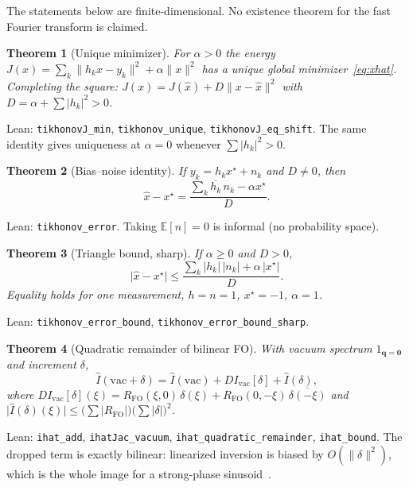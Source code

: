 \documentclass[11pt,a4paper]{article}
\newtheorem{theorem}{Theorem}[section]
\theoremstyle{definition}
\theoremstyle{remark}
\newcommand{\abs}[1]{\lvert#1\rvert}
\newcommand{\norm}[1]{\lVert#1\rVert}
\newcommand{\RFO}{R_{\mathrm{FO}}}
\begin{document}
The statements below are finite-dimensional.
No existence theorem for the fast Fourier transform is claimed.

\begin{theorem}[Unique minimizer]
\label{thm:unique}
For $\alpha>0$ the energy
$J(x)=\sum_k\norm{h_k x-y_k}^2+\alpha\norm{x}^2$
has a unique global minimizer~\eqref{eq:xhat}.
Completing the square:
$J(x)=J(\hat x)+D\norm{x-\hat x}^2$ with $D=\alpha+\sum\abs{h_k}^2>0$.
\end{theorem}
Lean: \texttt{tikhonovJ\_min}, \texttt{tikhonov\_unique},
\texttt{tikhonovJ\_eq\_shift}.
The same identity gives uniqueness at $\alpha=0$ whenever
$\sum\abs{h_k}^2>0$.

\begin{theorem}[Bias--noise identity]
\label{thm:error}
If $y_k=h_k x^\star+n_k$ and $D\neq 0$, then
\begin{equation}
\hat x-x^\star
=
\frac{\sum_k\overline{h_k}\,n_k-\alpha x^\star}{D}.
\end{equation}
\end{theorem}
Lean: \texttt{tikhonov\_error}.
Taking $\mathbb{E}[n]=0$ is informal (no probability space).

\begin{theorem}[Triangle bound, sharp]
\label{thm:bound}
If $\alpha\ge 0$ and $D>0$,
\begin{equation}
\abs{\hat x-x^\star}
\le
\frac{\sum_k\abs{h_k}\,\abs{n_k}+\alpha\,\abs{x^\star}}{D}.
\end{equation}
Equality holds for one measurement, $h=n=1$, $x^\star=-1$, $\alpha=1$.
\end{theorem}
Lean: \texttt{tikhonov\_error\_bound},
\texttt{tikhonov\_error\_bound\_sharp}.

\begin{theorem}[Quadratic remainder of bilinear FO]
\label{thm:quad}
With vacuum spectrum $1_{\mathbf{q}=\mathbf{0}}$ and increment $\delta$,
\begin{equation}
\hat I(\mathrm{vac}+\delta)
=
\hat I(\mathrm{vac})
+DI_{\mathrm{vac}}[\delta]
+\hat I(\delta),
\end{equation}
where $DI_{\mathrm{vac}}[\delta](\xi)=\RFO(\xi,0)\,\delta(\xi)+\RFO(0,-\xi)\,\overline{\delta(-\xi)}$
and $\abs{\hat I(\delta)(\xi)}\le\bigl(\sum\abs{\RFO}\bigr)\bigl(\sum\abs{\delta}\bigr)^2$.
\end{theorem}
Lean: \texttt{ihat\_add}, \texttt{ihatJac\_vacuum},
\texttt{ihat\_quadratic\_remainder}, \texttt{ihat\_bound}.
The dropped term is exactly bilinear: linearized inversion is biased by
$O(\norm{\delta}^2)$, which is the whole image for a strong-phase
sinusoid~\cite{Yu2017}.
\end{document}
